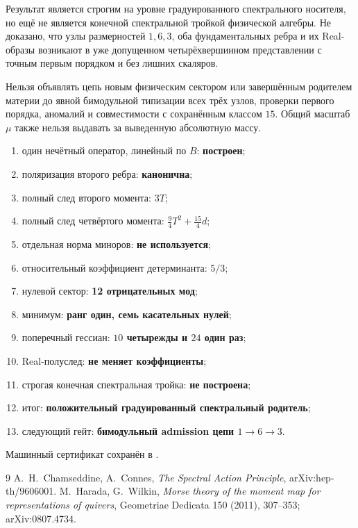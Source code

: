 Результат является строгим на уровне градуированного спектрального
носителя, но ещё не является конечной спектральной тройкой физической
алгебры. Не доказано, что узлы размерностей $1,6,3$, оба фундаментальных
ребра и их Real-образы возникают в уже допущенном четырёхвершинном
представлении с точным первым порядком и без лишних скаляров.

\begin{nogocriterion}
Нельзя объявлять цепь новым физическим сектором или завершённым родителем
материи до явной бимодульной типизации всех трёх узлов, проверки первого
порядка, аномалий и совместимости с сохранённым классом $15$. Общий
масштаб $\mu$ также нельзя выдавать за выведенную абсолютную массу.
\end{nogocriterion}

\begin{protocol}
\begin{enumerate}
 \item один нечётный оператор, линейный по $B$: \textbf{построен};
 \item поляризация второго ребра: \textbf{канонична};
 \item полный след второго момента: \textbf{$3T$};
 \item полный след четвёртого момента:
 \textbf{$\frac94T^2+\frac{15}{4}d$};
 \item отдельная норма миноров: \textbf{не используется};
 \item относительный коэффициент детерминанта: \textbf{$5/3$};
 \item нулевой сектор: \textbf{12 отрицательных мод};
 \item минимум: \textbf{ранг один, семь касательных нулей};
 \item поперечный гессиан: \textbf{$10$ четырежды и $24$ один раз};
 \item Real-полуслед: \textbf{не меняет коэффициенты};
 \item строгая конечная спектральная тройка: \textbf{не построена};
 \item итог: \textbf{положительный градуированный спектральный родитель};
 \item следующий гейт:
 \textbf{бимодульный admission цепи $1\to6\to3$}.
\end{enumerate}
\end{protocol}

Машинный сертификат сохранён в
.

\begin{thebibliography}{9}
A.~H.~Chamseddine, A.~Connes,
\emph{The Spectral Action Principle}, arXiv:hep-th/9606001.
M.~Harada, G.~Wilkin,
\emph{Morse theory of the moment map for representations of quivers},
Geometriae Dedicata 150 (2011), 307--353; arXiv:0807.4734.
\end{thebibliography}